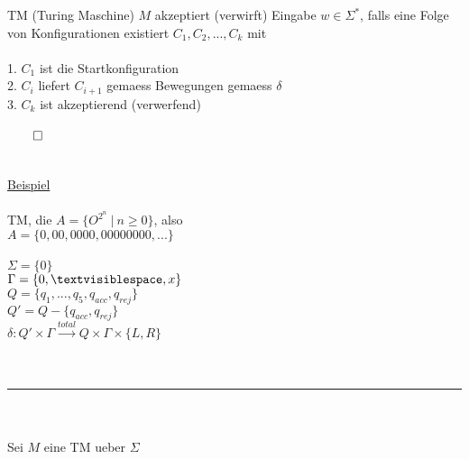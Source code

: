 \documentclass[18pt,a4paper]{scrreprt}
\begin{document}
TM (Turing Maschine) $M$ akzeptiert (verwirft) Eingabe $w \in \Sigma^*$, falls eine Folge von Konfigurationen existiert $C_1, C_2, ... , C_k$ mit\\
\\
1. $C_1$ ist die Startkonfiguration\\
2. $C_i$ liefert $C_{i+1}$ gemaess Bewegungen gemaess $\delta$\\
3. $C_k$ ist akzeptierend (verwerfend)\\
\\
$\qed$\\
\\
\\
\uline{Beispiel}\\
\\
TM, die $A = \{ O^{2^n} \:\vert\: n \geq 0\}$, also\\
$A = \{0, 00, 0000, 00000000, ... \}$\\
\\
$\Sigma = \{0\}$\\
$\Gamma = \{0, \textvisiblespace, x\}$\\
$Q = \{ q_1, ... , q_5, q_{acc}, q_{rej}\}$\\
$Q' = Q - \{q_{acc}, q_{rej}\}$\\
$\delta: Q' \times \Gamma \xrightarrow{total} Q \times \Gamma \times \{L,R\}$\\
\\
\\
\rule{\textwidth}{0.4mm}\\
\\
Sei $M$ eine TM ueber $\Sigma$\\
\end{document}
